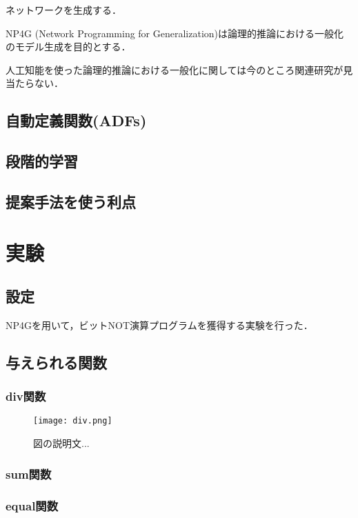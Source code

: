 \documentclass[exploratorypaper]{jsaiart} %
\begin{document}
ネットワークを生成する．

NP4G (Network Programming for Generalization)は論理的推論における一般化のモデル生成を目的とする．

人工知能を使った論理的推論における一般化に関しては今のところ関連研究が見当たらない．

\subsection{自動定義関数(ADFs)}

\subsection{段階的学習}
\subsection{提案手法を使う利点}

\section{実験}
\subsection{設定}
NP4Gを用いて，ビットNOT演算プログラムを獲得する実験を行った．

\subsection{与えられる関数}
\subsubsection{div関数}
\begin{figure*}[t]
    \begin{center}
        \texttt{[image: div.png]}
    \end{center}
    \capwidth=50mm %
    \caption{図の説明文... }
\end{figure*}

\subsubsection{sum関数}
\subsubsection{equal関数}
\end{document}
